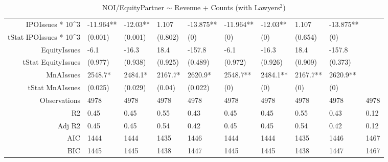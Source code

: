 \begin{table}[ht]
\begin{tabular}{rlllllllll}
  IPOIssues * 10^3 & -11.964** & -12.03** & 1.107 & -13.875** & -11.964** & -12.03** & 1.107 & -13.875** &  \\ 
  tStat IPOIssues * 10^3 & (0.001) & (0.001) & (0.802) & (0) & (0) & (0) & (0.654) & (0) &  \\ 
  EquityIssues & -6.1 & -16.3 & 18.4 & -157.8 & -6.1 & -16.3 & 18.4 & -157.8 &  \\ 
  tStat EquityIssues & (0.977) & (0.938) & (0.925) & (0.489) & (0.972) & (0.926) & (0.909) & (0.373) &  \\ 
  MnAIssues & 2548.7* & 2484.1* & 2167.7* & 2620.9* & 2548.7** & 2484.1** & 2167.7** & 2620.9** &  \\ 
  tStat MnAIssues & (0.025) & (0.029) & (0.04) & (0.022) & (0) & (0) & (0) & (0) &  \\ 
  Observations & 4978 & 4978 & 4978 & 4978 & 4978 & 4978 & 4978 & 4978 & 4978 \\ 
  R2 & 0.45 & 0.45 & 0.55 & 0.43 & 0.45 & 0.45 & 0.55 & 0.43 & 0.12 \\ 
  Adj R2 & 0.45 & 0.45 & 0.54 & 0.42 & 0.45 & 0.45 & 0.54 & 0.42 & 0.12 \\ 
  AIC & 1444 & 1444 & 1435 & 1446 & 1444 & 1444 & 1435 & 1446 & 1467 \\ 
  BIC & 1445 & 1445 & 1438 & 1447 & 1445 & 1445 & 1438 & 1447 & 1467 \\ 
   \hline
\end{tabular}
\caption{NOI/EquityPartner $\sim$ Revenue + Counts (with Lawyers$^2$)} 
\end{table}
